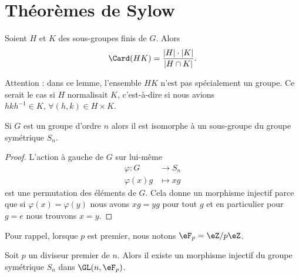 
\section{Théorèmes de Sylow}

\begin{lemma}
	Soient \( H\) et \( K\) des sous-groupes finis de \( G\). Alors
	\begin{equation}
		\Card(HK)=\frac{ | H |\cdot | K | }{ | H\cap K | }.
	\end{equation}
\end{lemma}
Attention : dans ce lemme, l'ensemble \( HK\) n'est pas spécialement un groupe. Ce serait le cas si \( H\) normalisait \( K\), c'est-à-dire si nous avions \( hkh^{-1}\in K,\,\forall (h,k)\in H\times K\).



\begin{lemma}    \label{ThoIfdlEB}   
	Si \( G\) est un groupe d'ordre \( n\) alors il est isomorphe à un sous-groupe du groupe symétrique \( S_n\).
\end{lemma}

\begin{proof}
	L'action à gauche de \( G\) sur lui-même
	\begin{equation}
		\begin{aligned}
			\varphi\colon G & \to S_n    \\
			\varphi(x)g     & \mapsto xg
		\end{aligned}
	\end{equation}
	est une permutation des éléments de \( G\). Cela donne un morphisme injectif parce que si \( \varphi(x)=\varphi(y)\) nous avons \( xg=yg\) pour tout \( g\) et en particulier pour \( g=e\) nous trouvons \( x=y\).
\end{proof}

Pour rappel, lorsque \( p\) est premier, nous notons \( \eF_p=\eZ/p\eZ\).

\begin{lemma}       \label{LemaQxjcm}
	Soit \( p\) un diviseur premier de \( n\). Alors il existe un morphisme injectif du groupe symétrique \( S_n\) dans \( \GL(n,\eF_p)\).
\end{lemma}

